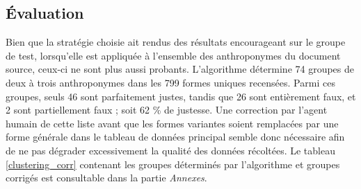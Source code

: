 \subsection{Évaluation}
Bien que la stratégie choisie ait rendus des résultats encourageant sur le groupe de test, lorsqu'elle est appliquée à l'ensemble des anthroponymes du document source, ceux-ci ne sont plus aussi probants. L'algorithme détermine 74 groupes de deux à trois anthroponymes dans les 799 formes uniques recensées. Parmi ces groupes, seuls 46 sont parfaitement justes, tandis que 26 sont entièrement faux, et 2 sont partiellement faux ; soit 62 \% de justesse. Une correction par l'agent humain de cette liste avant que les formes variantes soient remplacées par une forme générale dans le tableau de données principal semble donc nécessaire afin de ne pas dégrader excessivement la qualité des données récoltées.
Le tableau \ref{clustering_corr} contenant les groupes déterminés par l'algorithme et groupes corrigés est consultable dans la partie \textit{Annexes}.


